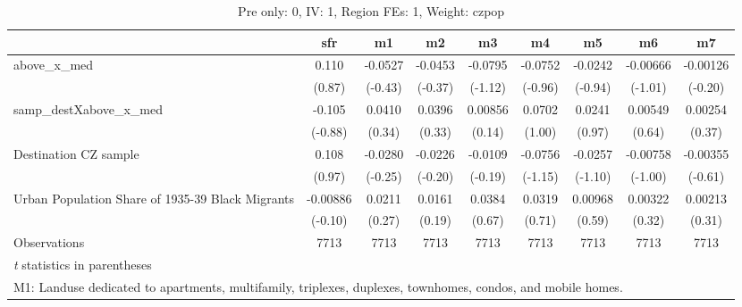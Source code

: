 \begin{table}[htbp]\centering
\def\sym#1{\ifmmode^{#1}\else\(^{#1}\)\fi}
\caption{Pre only: 0, IV: 1, Region FEs: 1, Weight: czpop}
\begin{tabular}{l*{8}{c}}
\toprule
                    &\multicolumn{1}{c}{sfr}&\multicolumn{1}{c}{m1}&\multicolumn{1}{c}{m2}&\multicolumn{1}{c}{m3}&\multicolumn{1}{c}{m4}&\multicolumn{1}{c}{m5}&\multicolumn{1}{c}{m6}&\multicolumn{1}{c}{m7}\\
\midrule
above\_x\_med         &       0.110   &     -0.0527   &     -0.0453   &     -0.0795   &     -0.0752   &     -0.0242   &    -0.00666   &    -0.00126   \\
                    &      (0.87)   &     (-0.43)   &     (-0.37)   &     (-1.12)   &     (-0.96)   &     (-0.94)   &     (-1.01)   &     (-0.20)   \\
\addlinespace
samp\_destXabove\_x\_med&      -0.105   &      0.0410   &      0.0396   &     0.00856   &      0.0702   &      0.0241   &     0.00549   &     0.00254   \\
                    &     (-0.88)   &      (0.34)   &      (0.33)   &      (0.14)   &      (1.00)   &      (0.97)   &      (0.64)   &      (0.37)   \\
\addlinespace
Destination CZ sample&       0.108   &     -0.0280   &     -0.0226   &     -0.0109   &     -0.0756   &     -0.0257   &    -0.00758   &    -0.00355   \\
                    &      (0.97)   &     (-0.25)   &     (-0.20)   &     (-0.19)   &     (-1.15)   &     (-1.10)   &     (-1.00)   &     (-0.61)   \\
\addlinespace
Urban Population Share of 1935-39 Black Migrants&    -0.00886   &      0.0211   &      0.0161   &      0.0384   &      0.0319   &     0.00968   &     0.00322   &     0.00213   \\
                    &     (-0.10)   &      (0.27)   &      (0.19)   &      (0.67)   &      (0.71)   &      (0.59)   &      (0.32)   &      (0.31)   \\
\midrule
Observations        &        7713   &        7713   &        7713   &        7713   &        7713   &        7713   &        7713   &        7713   \\
\bottomrule
\multicolumn{9}{l}{\footnotesize \textit{t} statistics in parentheses}\\
\multicolumn{9}{l}{\footnotesize M1: Landuse dedicated to apartments, multifamily, triplexes, duplexes, townhomes, condos, and mobile homes.}\\

\end{tabular}
\end{table}
